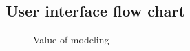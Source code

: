 \subsection{User interface flow chart}

\begin{figure}[H]
\caption{Value of modeling \cite{valueofmodeling}}
\end{figure}